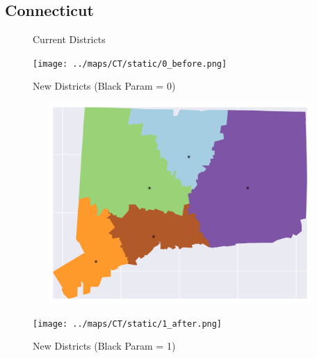 \subsection{Connecticut}
\begin{figure}[htb!] \centering
\caption{ Current Districts }
\texttt{[image: ../maps/CT/static/0\_before.png]}
\caption{ New Districts (Black Param = 0) }
\includegraphics[width=5in,height=3in,keepaspectratio]{../maps/CT/static/0_after.png}
\caption{ New Districts (Black Param = 1) }
\texttt{[image: ../maps/CT/static/1\_after.png]}
\end{figure}

\clearpage
\newpage

